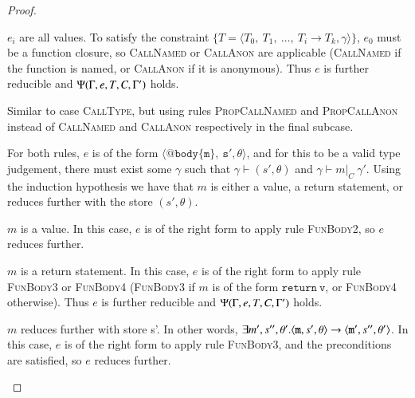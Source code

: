 \begin{proof}
\begin{case}[CallType]
	\begin{subcase}
	  $e_i$ are all values.
	  To satisfy the constraint $\{T = \langle T_0,\ T_1,\ \dots,\ T_i \rightarrow T_k, \gamma\rangle\}$,
	  $e_0$ must be a function closure, so \textsc{CallNamed} or \textsc{CallAnon} are
	  applicable (\textsc{CallNamed} if the function is named, or \textsc{CallAnon} if
	  it is anonymous). Thus $e$ is further reducible and $\Psi(\Gamma, e, T, C, \Gamma')$ holds.
	\end{subcase}

  \end{case}

  \begin{case}[PropCallType]\label{case:prog-propcalltype}

	Similar to case \textsc{CallType}, but using rules \textsc{PropCallNamed}
	and \textsc{PropCallAnon} instead of \textsc{CallNamed} and
	\textsc{CallAnon} respectively in the final subcase.

  \end{case}

  \begin{case}\label{case:prog-bodytype}

	For both rules, $e$ is of the form $\mathtt{\langle @body\{m\},\ s', \theta\rangle}$, and for this
	to be a valid type judgement, there must exist some $\gamma$ such that
	$\gamma \vdash(s', \theta)$ and $\gamma\vdash m |_C\ \gamma'$.
	Using the induction hypothesis we have that $m$ is either
	a value, a return statement, or reduces further with the store $(s', \theta)$.

	\begin{subcase}
	  $m$ is a value.
	  In this case, $e$ is of the right form to apply rule \textsc{FunBody2},
	  so $e$ reduces further. 
	\end{subcase}

	\begin{subcase}
	  $m$ is a return statement.
	  In this case, $e$ is of the right form to apply rule \textsc{FunBody3} or
	  \textsc{FunBody4} (\textsc{FunBody3} if $m$ is of the form
	  $\mathtt{return\ v}$, or \textsc{FunBody4} otherwise). Thus $e$ is
	  further reducible and $\Psi(\Gamma, e, T, C, \Gamma')$ holds.
	\end{subcase}

	\begin{subcase}
	  $m$ reduces further with store s'.
	  In other words, $\exists m', s'', \theta'. \langle{}\mathtt{m},s',\theta\rangle{}\rightarrow{}\langle{}\mathtt{m'},s'',\theta'\rangle$.
	  In this case, $e$ is of the right form to apply rule \textsc{FunBody3},
	  and the preconditions are satisfied, so $e$ reduces further. 
	\end{subcase}


\end{case}
\end{proof}
